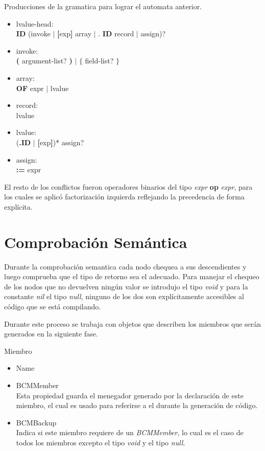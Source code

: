 \documentclass[a4paper,10pt]{article}
\begin{document}
		\pagebreak
		
		Producciones de la gramatica para lograr el automata anterior.
		\begin{itemize}
			\item lvalue-head:\\
				\textbf{ID} (invoke $\left|\right.$ \textbf{[}exp\textbf{]} array $\left|\right.$ . \textbf{ID} record $\left|\right.$ assign)?
			\item invoke:\\
				\textbf{(} argument-list? \textbf{)} $\left|\right.$ \textbf{$\lbrace$} field-list? \textbf{$\rbrace$}
			\item array:\\
				\textbf{OF} expr $\left|\right.$ lvalue
			\item record:\\
				lvalue
			\item lvalue:\\
				(\textbf{.ID} $\left|\right.$ \textbf{[}exp\textbf{]})* assign?
			\item assign:\\
				\textbf{:=} expr				
		\end{itemize}
		
		El resto de los conflictos fueron operadores binarios del tipo \textit{expr} \textbf{op} \textit{expr}, para los cuales se aplicó
		factorización izquierda reflejando la precedencia de forma explícita.
		
	\section{Comprobación Semántica}
		
		Durante la comprobación semantica cada nodo chequea a sus descendientes y luego comprueba que el tipo de retorno sea el adecuado.
		Para manejar el chequeo de los nodos que no devuelven ningún valor se introdujo el tipo \textit{void} y para la constante \textit{nil} el tipo \textit{null}, ninguno de los dos son explícitamente accesibles al código que se está compilando.
		
		Durante este proceso se trabaja con objetos que describen los miembros que serán generados en la siguiente fase.
		
		Miembro
		\begin{itemize}
			\item Name
			\item BCMMember\\
				Esta propiedad guarda el menegador generado por la declaración de este miembro, el cual es usado para referirse a el durante la generación de código.
			\item BCMBackup\\
				Indica si este miembro requiere de un \textit{BCMMember}, lo cual es el caso de todos los miembros excepto el tipo \textit{void} y el tipo \textit{null}.
		\end{itemize}
		
\end{document}
